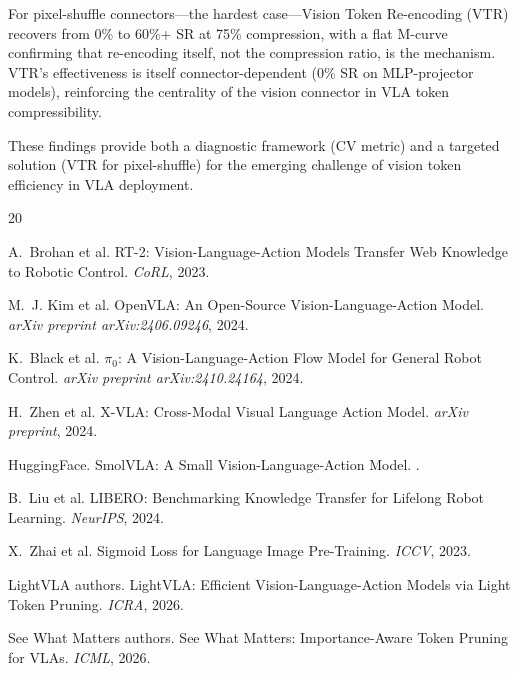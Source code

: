 \documentclass[letterpaper]{article}
\begin{document}
For pixel-shuffle connectors---the hardest case---Vision Token Re-encoding (VTR) recovers from 0\% to 60\%+ SR at 75\% compression, with a flat M-curve confirming that re-encoding itself, not the compression ratio, is the mechanism. VTR's effectiveness is itself connector-dependent (0\% SR on MLP-projector models), reinforcing the centrality of the vision connector in VLA token compressibility.

These findings provide both a diagnostic framework (CV metric) and a targeted solution (VTR for pixel-shuffle) for the emerging challenge of vision token efficiency in VLA deployment.


\begin{thebibliography}{20}

A.~Brohan et al.
\newblock RT-2: Vision-Language-Action Models Transfer Web Knowledge to Robotic Control.
\newblock \emph{CoRL}, 2023.

M.~J. Kim et al.
\newblock OpenVLA: An Open-Source Vision-Language-Action Model.
\newblock \emph{arXiv preprint arXiv:2406.09246}, 2024.

K.~Black et al.
\newblock $\pi_0$: A Vision-Language-Action Flow Model for General Robot Control.
\newblock \emph{arXiv preprint arXiv:2410.24164}, 2024.

H.~Zhen et al.
\newblock X-VLA: Cross-Modal Visual Language Action Model.
\newblock \emph{arXiv preprint}, 2024.

HuggingFace.
\newblock SmolVLA: A Small Vision-Language-Action Model.
.

B.~Liu et al.
\newblock LIBERO: Benchmarking Knowledge Transfer for Lifelong Robot Learning.
\newblock \emph{NeurIPS}, 2024.

X.~Zhai et al.
\newblock Sigmoid Loss for Language Image Pre-Training.
\newblock \emph{ICCV}, 2023.

LightVLA authors.
\newblock LightVLA: Efficient Vision-Language-Action Models via Light Token Pruning.
\newblock \emph{ICRA}, 2026.

See What Matters authors.
\newblock See What Matters: Importance-Aware Token Pruning for VLAs.
\newblock \emph{ICML}, 2026.

\end{thebibliography}
\end{document}
